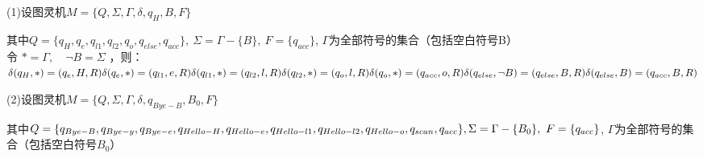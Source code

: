 \documentclass[a4paper,12pt,oneside,final,titlepage]{article}
\begin{document}
\begin{adjustwidth}{2em}{}
(1)设图灵机$M = \{ Q, \Sigma, \Gamma, \delta, q_H, B, F \}$ 
\begin{adjustwidth}{2em}{}
其中$Q = \{q_H, q_e, q_{l1} ,q_{l2}, q_o, q_{else}, q_{acc}\}, \ \Sigma = \Gamma - \{B\},\ F = \{q_{acc}\}$, $\Gamma$为全部符号的集合（包括空白符号B） \\
令 $* = \Gamma,\quad \neg B = \Sigma$ ，则：\\ 
$\delta(q_H, *) = (q_e, H, R) \\
\delta(q_e, *) = (q_{l1}, e, R) \\
\delta(q_{l1}, *) = (q_{l2}, l, R) \\
\delta(q_{l2}, *) = (q_{o}, l, R) \\
\delta(q_o, *) = (q_{acc}, o, R) \\
\delta(q_{else}, \neg B) = (q_{else}, B, R) \\
\delta(q_{else}, B) = (q_{acc}, B, R)$
\end{adjustwidth}
\begin{adjustwidth}{2em}{}
\end{adjustwidth}
(2)设图灵机$M = \{ Q, \Sigma, \Gamma, \delta, q_{Bye-B}, B_0, F \}$ 
\begin{adjustwidth}{2em}{}
其中$Q = \{q_{Bye-B}, q_{Bye-y}, q_{Bye-e}, q_{Hello-H},q_{Hello-e},q_{Hello-l1},q_{Hello-l2},q_{Hello-o}, q_{scan}, q_{acc}\}, \\ \Sigma = \Gamma - \{B_0\},\ F = \{q_{acc}\}$, $\Gamma$为全部符号的集合（包括空白符号$B_0$） \\

\end{adjustwidth}
\end{adjustwidth}
\end{document}
